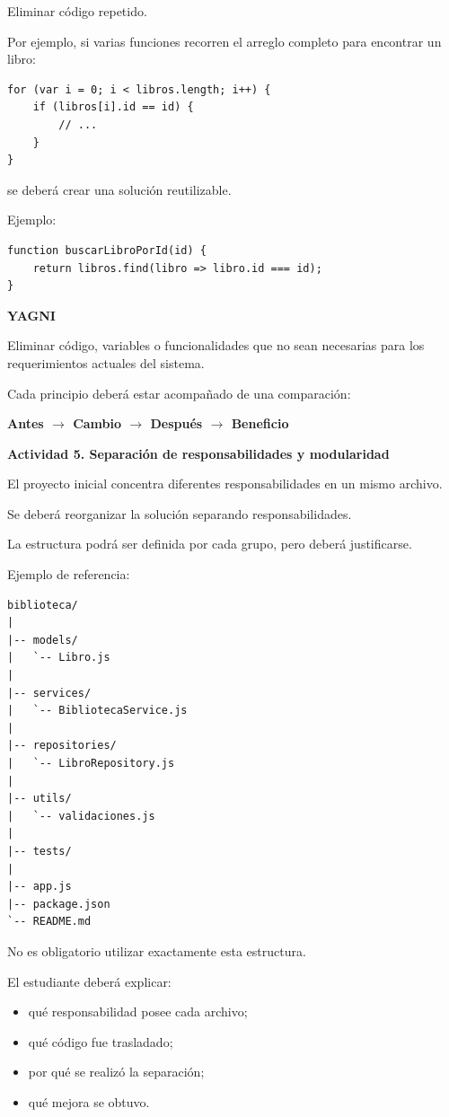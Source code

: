 \documentclass[12pt,letterpaper]{article}
\newcommand{\flechar}{$\rightarrow$}
\begin{document}
Eliminar c\'odigo repetido.

Por ejemplo, si varias funciones recorren el arreglo completo para encontrar un libro:
\begin{lstlisting}
for (var i = 0; i < libros.length; i++) {
    if (libros[i].id == id) {
        // ...
    }
}
\end{lstlisting}

se deber\'a crear una soluci\'on reutilizable.

Ejemplo:
\begin{lstlisting}
function buscarLibroPorId(id) {
    return libros.find(libro => libro.id === id);
}
\end{lstlisting}

\vspace{4pt}
\textbf{YAGNI}

Eliminar c\'odigo, variables o funcionalidades que no sean necesarias para los requerimientos actuales del sistema.

Cada principio deber\'a estar acompa\~nado de una comparaci\'on:

\textbf{Antes \flechar{} Cambio \flechar{} Despu\'es \flechar{} Beneficio}

\vspace{8pt}

\noindent\textbf{Actividad 5. Separaci\'on de responsabilidades y modularidad}

\vspace{2pt}
El proyecto inicial concentra diferentes responsabilidades en un mismo archivo.

Se deber\'a reorganizar la soluci\'on separando responsabilidades.

La estructura podr\'a ser definida por cada grupo, pero deber\'a justificarse.

Ejemplo de referencia:
\begin{lstlisting}
biblioteca/
|
|-- models/
|   `-- Libro.js
|
|-- services/
|   `-- BibliotecaService.js
|
|-- repositories/
|   `-- LibroRepository.js
|
|-- utils/
|   `-- validaciones.js
|
|-- tests/
|
|-- app.js
|-- package.json
`-- README.md
\end{lstlisting}

No es obligatorio utilizar exactamente esta estructura.

El estudiante deber\'a explicar:

\begin{itemize}[leftmargin=1.27cm, label=\textbullet, topsep=1pt, itemsep=0pt, parsep=0pt]
  \item qu\'e responsabilidad posee cada archivo;
  \item qu\'e c\'odigo fue trasladado;
  \item por qu\'e se realiz\'o la separaci\'on;
  \item qu\'e mejora se obtuvo.
\end{itemize}
\end{document}
